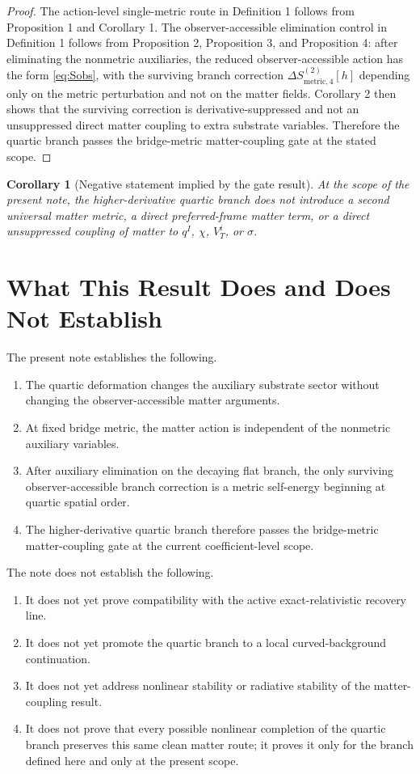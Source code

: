 \documentclass[11pt]{article}
\newtheorem{corollary}{Corollary}
\begin{document}
\begin{proof}
The action-level single-metric route in Definition 1 follows from Proposition 1 and Corollary 1. The observer-accessible elimination control in Definition 1 follows from Proposition 2, Proposition 3, and Proposition 4: after eliminating the nonmetric auxiliaries, the reduced observer-accessible action has the form \eqref{eq:Sobs}, with the surviving branch correction \(\Delta S_{\mathrm{metric},4}^{(2)}[h]\) depending only on the metric perturbation and not on the matter fields. Corollary 2 then shows that the surviving correction is derivative-suppressed and not an unsuppressed direct matter coupling to extra substrate variables. Therefore the quartic branch passes the bridge-metric matter-coupling gate at the stated scope.
\end{proof}

\begin{corollary}[Negative statement implied by the gate result]
At the scope of the present note, the higher-derivative quartic branch does not introduce a second universal matter metric, a direct preferred-frame matter term, or a direct unsuppressed coupling of matter to \(q^I\), \(\chi\), \(V_T^i\), or \(\sigma\).
\end{corollary}

\section{What This Result Does and Does Not Establish}

The present note establishes the following.
\begin{enumerate}
    \item The quartic deformation changes the auxiliary substrate sector without changing the observer-accessible matter arguments.
    \item At fixed bridge metric, the matter action is independent of the nonmetric auxiliary variables.
    \item After auxiliary elimination on the decaying flat branch, the only surviving observer-accessible branch correction is a metric self-energy beginning at quartic spatial order.
    \item The higher-derivative quartic branch therefore passes the bridge-metric matter-coupling gate at the current coefficient-level scope.
\end{enumerate}

The note does not establish the following.
\begin{enumerate}
    \item It does not yet prove compatibility with the active exact-relativistic recovery line.
    \item It does not yet promote the quartic branch to a local curved-background continuation.
    \item It does not yet address nonlinear stability or radiative stability of the matter-coupling result.
    \item It does not prove that every possible nonlinear completion of the quartic branch preserves this same clean matter route; it proves it only for the branch defined here and only at the present scope.
\end{enumerate}
\end{document}
